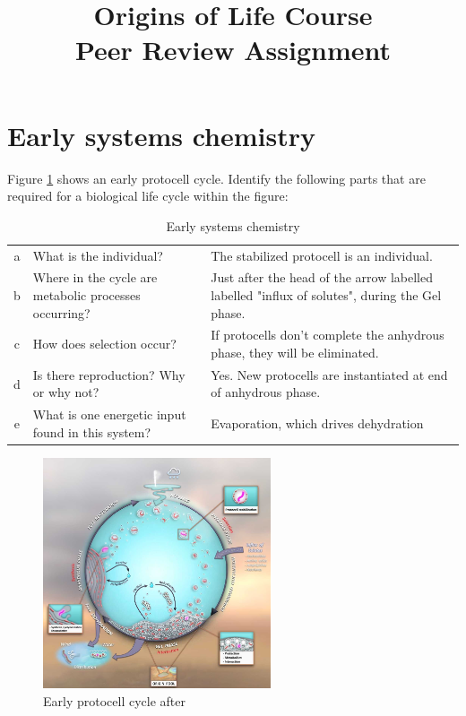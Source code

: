 \documentclass[]{article}
\title{
	Origins of Life Course\\
	Peer Review Assignment
}
\begin{document}
\maketitle

\tableofcontents
\listoffigures

\section{Early systems chemistry}

Figure \ref{fig:damer} shows an early protocell cycle. Identify the following parts that are
required for a biological life cycle within the figure:
\begin{table}[H]
	\caption{Early systems chemistry}	{
	\begin{tabular}{|c|p{3cm}|p{8cm}|}\hline
	a&	What is the individual? &The stabilized protocell is an individual.\\
	b&	Where in the cycle are metabolic processes occurring? &Just after the head of the arrow labelled labelled "influx of solutes", during the Gel phase.\\
	c&	How does selection occur?&If protocells don't complete the anhydrous phase, they will be eliminated. \\
	d&	Is there reproduction? Why or why not? &Yes. New protocells are instantiated at end of anhydrous phase.\\
	e&	What is one energetic input found in this system?&Evaporation, which drives dehydration\cite{damer2016field}\\\hline
	\end{tabular}}
\end{table}

\begin{figure}[H]
\begin{center}
		\caption[Early protocell cycle]{Early protocell cycle after \cite{damer2016field}}\label{fig:damer}
		\includegraphics[width=0.6\textwidth]{WarmLittlePond}
	\end{center}
\end{figure}
\end{document}

